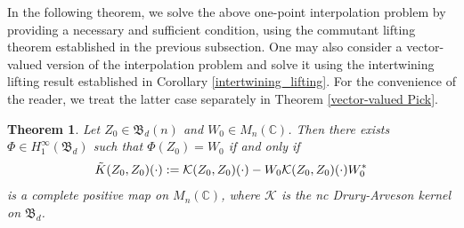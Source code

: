 \documentclass[12pt]{amsart}%
\newtheorem{theorem}{Theorem}[section]
\numberwithin{equation}{section}
\newcommand{\fB}{{\mathfrak{B}}}
\newcommand{\clk}{\mathcal{K}}
\newcommand{\C}{\mathbb{C}}
\begin{document}
In the following theorem, we solve the above one-point interpolation problem by providing a necessary and sufficient condition, using the commutant lifting theorem established in the previous subsection. One may also consider a vector-valued version of the interpolation problem and solve it using the intertwining lifting result established in Corollary \ref{intertwining_lifting}. For the convenience of the reader, we treat the latter case separately in Theorem \ref{vector-valued Pick}.
\begin{theorem}\label{Scaler nc pick theorem}
Let $Z_0\in \fB_d(n)$ and $W_0\in M_n(\C)$. Then there exists $\Phi\in H_1^\infty(\fB_d)$ such that $\Phi(Z_0)=W_0$ if and only if
\[ \Tilde{K}(Z_0, Z_0)(\cdot):=\clk(Z_0, Z_0)(\cdot)-W_0 \clk(Z_0, Z_0)(\cdot) W_0^*\]
is a complete positive map on $M_n(\C)$, where $\clk$ is the nc Drury-Arveson kernel on $\fB_d$.
\end{theorem}
\end{document}
